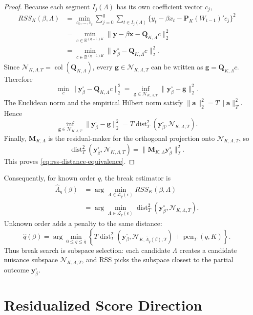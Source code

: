 \documentclass[12pt]{article}
\numberwithin{equation}{section}
\theoremstyle{definition}
\newcommand{\R}{\mathbb R}
\newcommand{\N}{\mathcal N}
\begin{document}
\begin{proof}
Because each segment \(I_j(\Lambda)\) has its own coefficient vector \(c_j\),
\[
\begin{aligned}
    RSS_K(\beta,\Lambda)
    &=\min_{c_0,\ldots,c_q}
      \sum_{j=0}^q\sum_{t\in I_j(\Lambda)}
      \{y_t-\beta x_t-\bm P_K(W_{t-1})'c_j\}^2 \\
    &=\min_{c\in\R^{(q+1)K}}
      \|\bm y-\beta\bm x-\bm Q_{K,\Lambda}c\|_2^2 \\
    &=\min_{c\in\R^{(q+1)K}}
      \|\bm y_\beta^\circ-\bm Q_{K,\Lambda}c\|_2^2.
\end{aligned}
\]
Since \(\N_{K,\Lambda,T}=\operatorname{col}(\bm Q_{K,\Lambda})\), every
\(\bm g\in\N_{K,\Lambda,T}\) can be written as
\(\bm g=\bm Q_{K,\Lambda}c\). Therefore
\[
    \min_c\|\bm y_\beta^\circ-\bm Q_{K,\Lambda}c\|_2^2
    =\inf_{\bm g\in\N_{K,\Lambda,T}}
      \|\bm y_\beta^\circ-\bm g\|_2^2.
\]
The Euclidean norm and the empirical Hilbert norm satisfy
\(\|\bm a\|_2^2=T\|\bm a\|_T^2\). Hence
\[
    \inf_{\bm g\in\N_{K,\Lambda,T}}
      \|\bm y_\beta^\circ-\bm g\|_2^2
    =T\operatorname{dist}_T^2(\bm y_\beta^\circ,\N_{K,\Lambda,T}).
\]
Finally, \(\bm M_{K,\Lambda}\) is the residual-maker for the orthogonal
projection onto \(\N_{K,\Lambda,T}\), so
\[
    \operatorname{dist}_T^2(\bm y_\beta^\circ,\N_{K,\Lambda,T})
    =\|\bm M_{K,\Lambda}\bm y_\beta^\circ\|_T^2.
\]
This proves \eqref{eq:rss-distance-equivalence}.
\end{proof}

Consequently, for known order \(q\), the break estimator is
\[
\begin{aligned}
    \widehat\Lambda_q(\beta)
    &=\arg\min_{\Lambda\in\mathcal L_q(\epsilon)} RSS_K(\beta,\Lambda) \\
    &=\arg\min_{\Lambda\in\mathcal L_q(\epsilon)}
      \operatorname{dist}_T^2(\bm y_\beta^\circ,\N_{K,\Lambda,T}).
\end{aligned}
\]
Unknown order adds a penalty to the same distance:
\[
    \widehat q(\beta)
    =\arg\min_{0\le q\le\bar q}
     \left\{
       T\operatorname{dist}_T^2
       (\bm y_\beta^\circ,\N_{K,\widehat\Lambda_q(\beta),T})
       +\operatorname{pen}_T(q,K)
     \right\}.
\]
Thus break search is subspace selection: each candidate \(\Lambda\) creates a
candidate nuisance subspace \(\N_{K,\Lambda,T}\), and RSS picks the subspace
closest to the partial outcome \(\bm y_\beta^\circ\).
\section{Residualized Score Direction}
\end{document}
